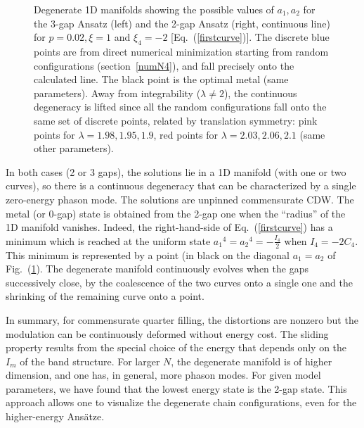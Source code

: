 \documentclass[]{revtex4-1}
\begin{document}
\begin{figure}[h] \begin{center}
  \end{center} \caption{Degenerate 1D manifolds showing the possible values of $a_1,a_2$ for the 3-gap Ansatz (left) and the 2-gap Ansatz (right, continuous line) for $p=0.02,\xi=1$ and $\xi_4=-2$ [Eq.~(\ref{firstcurve})].
    The discrete blue points are from direct numerical minimization starting from random configurations (section~\ref{numN4}), and fall precisely onto the calculated line. The black point is the optimal metal (same parameters). Away from integrability ($\lambda \neq 2$), the continuous degeneracy is lifted since all the random configurations fall onto the same set of discrete points, related by translation symmetry: pink points for $\lambda=1.98,1.95,1.9$, red points for $\lambda=2.03,2.06,2.1$ (same other parameters).
    }
  \label{contour}
\end{figure}

In both cases (2 or 3 gaps), the solutions lie in a 1D manifold (with one or two curves), so there is a continuous degeneracy that can be characterized by a single zero-energy phason mode. The solutions are unpinned commensurate CDW.
The metal (or 0-gap) state is obtained from the 2-gap one when the ``radius'' of the 1D manifold vanishes. Indeed, the right-hand-side of Eq.~(\ref{firstcurve}) has a minimum which is reached at the uniform state ${a_1}^4={a_2}^4=-\frac{I_4}{2}$ when $I_4=-2C_4$. This minimum is represented by a point (in black on the diagonal $a_1=a_2$ of Fig.~(\ref{contour}).
The degenerate manifold continuously evolves when the gaps successively close, by the coalescence of the two curves onto a single one and the shrinking of the remaining curve onto a point.

In summary, for commensurate quarter filling, the distortions are nonzero but the modulation can be continuously deformed without energy cost.  The sliding property results from the special choice of the energy that depends only on the $I_m$ of the band structure. For larger $N$, the degenerate manifold is of higher dimension, and one has, in general, more phason modes.
For given model parameters, we have found that the lowest energy state is the 2-gap state. This approach allows one to visualize the degenerate chain configurations, even for the higher-energy Ans\"atze.
\end{document}
